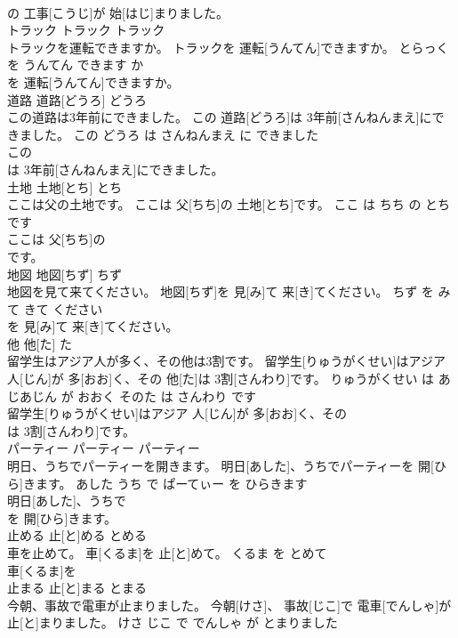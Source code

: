 \documentclass[8pt]{extreport}
\begin{document}
\begin{CJK}{UTF8}{min}
\\	の 工事[こうじ]が 始[はじ]まりました。			
\\	トラック	トラック	トラック	
\\	トラックを運転できますか。	トラックを 運転[うんてん]できますか。	とらっく を うんてん できます か	
\\	を 運転[うんてん]できますか。			
\\	道路	道路[どうろ]	どうろ	
\\	この道路は3年前にできました。	この 道路[どうろ]は 3年前[さんねんまえ]にできました。	この どうろ は さんねんまえ に できました	
\\	この
\\	は 3年前[さんねんまえ]にできました。			
\\	土地	土地[とち]	とち	
\\	ここは父の土地です。	ここは 父[ちち]の 土地[とち]です。	ここ は ちち の とち です	
\\	ここは 父[ちち]の
\\	です。			
\\	地図	地図[ちず]	ちず	
\\	地図を見て来てください。	地図[ちず]を 見[み]て 来[き]てください。	ちず を みて きて ください	
\\	を 見[み]て 来[き]てください。			
\\	他	他[た]	た	
\\	留学生はアジア人が多く、その他は3割です。	留学生[りゅうがくせい]はアジア 人[じん]が 多[おお]く、その 他[た]は 3割[さんわり]です。	りゅうがくせい は あじあじん が おおく そのた は さんわり です	
\\	留学生[りゅうがくせい]はアジア 人[じん]が 多[おお]く、その
\\	は 3割[さんわり]です。			
\\	パーティー	パーティー	パーティー	
\\	明日、うちでパーティーを開きます。	明日[あした]、うちでパーティーを 開[ひら]きます。	あした うち で ぱーてぃー を ひらきます	
\\	明日[あした]、うちで
\\	を 開[ひら]きます。			
\\	止める	止[と]める	とめる	
\\	車を止めて。	車[くるま]を 止[と]めて。	くるま を とめて	
\\	車[くるま]を
\\	止まる	止[と]まる	とまる	
\\	今朝、事故で電車が止まりました。	今朝[けさ]、 事故[じこ]で 電車[でんしゃ]が 止[と]まりました。	けさ じこ で でんしゃ が とまりました	

\end{CJK}
\end{document}

